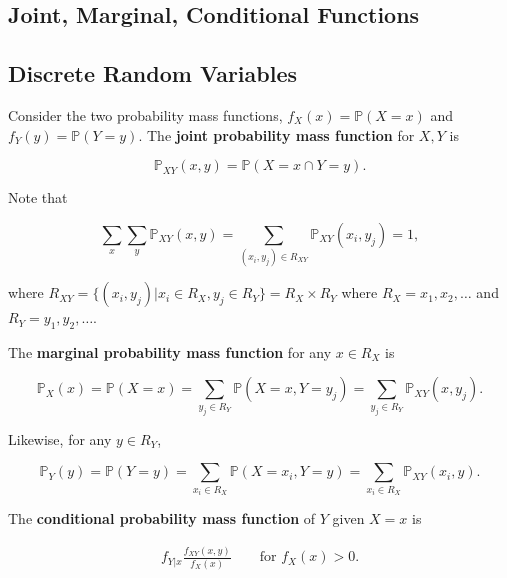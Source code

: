 \documentclass[12pt]{article}
\newcommand{\prob}[1]{\mathbb{P}(#1)}
\begin{document}
\begin{center}
\section*{Joint, Marginal, Conditional Functions}
\end{center}

\subsection*{Discrete Random Variables}
\noindent
Consider the two probability mass functions, $f_X(x) = \prob{X = x}$ and $f_Y(y) = \prob{Y = y}$. The \textbf{joint probability mass function} for $X,Y$ is

\begin{equation*}
\mathbb{P}_{XY}(x,y) = \prob{X = x \cap Y = y}.
\end{equation*}

\noindent
Note that 

\begin{equation*}
\sum_{x} \sum_{y} \mathbb{P}_{XY}(x,y) = \sum_{(x_i, y_j) \in R_{XY}} \mathbb{P}_{XY}(x_i,y_j) =  1,
\end{equation*}

\noindent
where $R_{XY} = \{ (x_i, y_j) \lvert x_i \in R_X, y_j \in R_Y \} = R_{X} \times R_{Y}$ where $R_X = {x_1, x_2, \ldots }$ and $R_Y = {y_1, y_2, \ldots }$. 

\vspace*{.5cm}
\noindent
The \textbf{marginal probability mass function} for any $x \in R_X$ is

\begin{equation*}
\mathbb{P}_X(x) = \prob{X = x} = \sum_{y_j \in R_Y} \prob{X = x, Y = y_j} = \sum_{y_j \in R_Y} \mathbb{P}_{XY}(x,y_j).
\end{equation*}

\noindent
Likewise, for any $y \in R_Y$,

\begin{equation*}
\mathbb{P}_Y(y) = \prob{Y = y} = \sum_{x_i \in R_X} \prob{X = x_i, Y = y} = \sum_{x_i \in R_X} \mathbb{P}_{XY}(x_i,y).
\end{equation*}

\vspace*{.5cm}
\noindent
The \textbf{conditional probability mass function} of $Y$ given $X = x$ is

\begin{align*}
f_{Y \lvert x} \frac{f_{XY}(x,y)}{f_X(x)} \qquad \text{for } f_X(x) > 0.
\end{align*}
\end{document}
